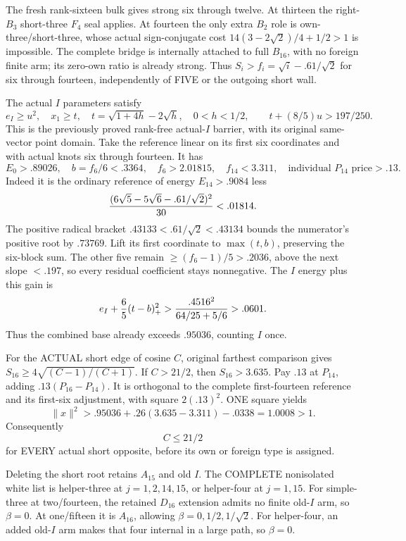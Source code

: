 \documentclass[11pt]{article}
\begin{document}
The fresh rank-sixteen bulk gives strong
six through twelve.
At thirteen the right-\(B_3\) short-three
\(F_4\) seal applies.
At fourteen the only extra \(B_2\)
role is own-three/short-three, whose
actual sign-conjugate cost
\(14(3-2\sqrt2)/4+1/2>1\) is impossible.
The complete bridge is internally attached
to full \(B_{16}\), with no foreign
finite arm; its zero-own ratio is already
strong.
Thus \(S_i>f_i=\sqrt i-.61/\sqrt2\)
for six through fourteen, independently
of FIVE or the outgoing short wall.

The actual \(I\) parameters satisfy
\[
 e_I\ge u^2,\quad x_1\ge t,\quad
 t=\sqrt{1+4h}-2\sqrt h,\quad0<h<1/2,\qquad
                        t+(8/5)u>197/250 .
\]
This is the previously proved rank-free
actual-\(I\) barrier, with its original
same-vector point domain.
Take the reference linear on its first
six coordinates and with actual knots
six through fourteen.
It has
\[
 E_0>.89026,\quad b=f_6/6<.3364,\quad
 f_6>2.01815,\quad f_{14}<3.311,\quad
                   \text{individual }P_{14}\text{ price}>.13 .
\]
Indeed it is the ordinary reference of
energy \(E_{14}>.9084\) less
\[
               { (6\sqrt5-5\sqrt6-.61/\sqrt2)^2\over30}<.01814 .
\]
The positive radical bracket
\(.43133<.61/\sqrt2<.43134\)
bounds the numerator's positive root by
\(.73769\).
Lift its first coordinate to \(\max(t,b)\),
preserving the six-block sum.
The other five remain
\(\ge(f_6-1)/5>.2036\), above the next
slope \(<.197\), so every residual
coefficient stays nonnegative.
The \(I\) energy plus this gain is
\[
       e_I+{6\over5}(t-b)_+^2
          >{.4516^2\over64/25+5/6}>.0601 .
\]
Thus the combined base already exceeds
\(.95036\), counting \(I\) once.

For the ACTUAL short edge of cosine \(C\),
original farthest comparison gives
\(S_{16}\ge4\sqrt{(C-1)/(C+1)}\).
If \(C>21/2\), then \(S_{16}>3.635\).
Pay \(.13\) at \(P_{14}\), adding
\(.13(P_{16}-P_{14})\).
It is orthogonal to the complete first-fourteen
reference and its first-six adjustment,
with square \(2(.13)^2\).
ONE square yields
\[
                \|x\|^2>.95036+.26(3.635-3.311)-.0338
                            =1.0008>1 .
\]
Consequently
\[
                                    C\le21/2
\tag{B16Icut}\label{eq:arithB16Ishortcut}
\]
for EVERY actual short opposite, before
its own or foreign type is assigned.

Deleting the short root retains \(A_{15}\)
and old \(I\).
The COMPLETE nonisolated white list is
helper-three at \(j=1,2,14,15\), or
helper-four at \(j=1,15\).
For simple-three at two/fourteen,
the retained \(D_{16}\) extension admits
no finite old-\(I\) arm, so \(\beta=0\).
At one/fifteen it is \(A_{16}\), allowing
\(\beta=0,1/2,1/\sqrt2\).
For helper-four, an added old-\(I\) arm
makes that four internal in a large path,
so \(\beta=0\).
\end{document}
